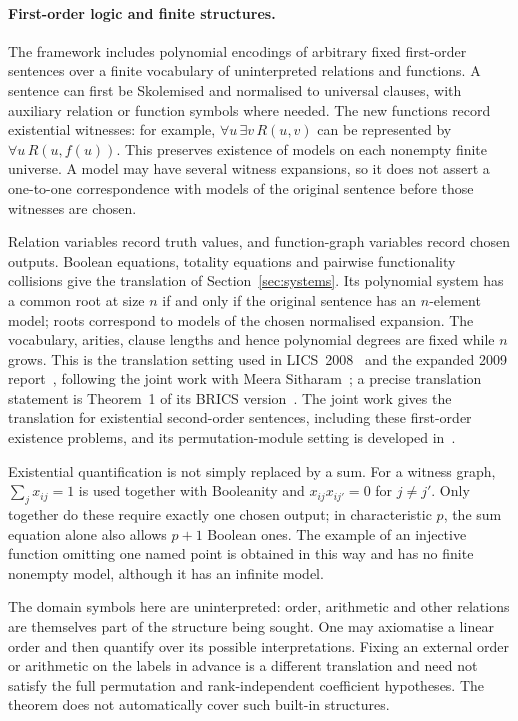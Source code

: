 \documentclass[11pt,a4paper]{article}
\theoremstyle{definition}\newtheorem{definition}[theorem]{Definition}
\theoremstyle{remark}\newtheorem{remark}[theorem]{Remark}
\begin{document}
\paragraph{First-order logic and finite structures.}
The framework includes polynomial encodings of arbitrary fixed
first-order sentences over a finite vocabulary of uninterpreted
relations and functions. A sentence can first be Skolemised and
normalised to universal clauses, with auxiliary relation or function
symbols where needed. The new functions record existential witnesses:
for example, $\forall u\,\exists v\,R(u,v)$ can be represented by
$\forall u\,R(u,f(u))$. This preserves existence of models on each
nonempty finite universe. A model may have several witness expansions,
so it does not assert a one-to-one correspondence with models of the
original sentence before those witnesses are chosen.

Relation variables record truth values, and function-graph variables
record chosen outputs. Boolean equations, totality equations and
pairwise functionality collisions give the translation of
Section~\ref{sec:systems}. Its polynomial system has a common root
at size $n$ if and only if the original sentence has an $n$-element
model; roots correspond to models of the chosen normalised expansion.
The vocabulary, arities, clause lengths and hence polynomial degrees
are fixed while $n$ grows. This is the translation setting used in
LICS~2008~\cite[Section~1.2, p.~273]{Riis} and the expanded
2009 report~\cite[Section~1.2, pp.~3--4]{RiisLong}, following the joint work
with Meera Sitharam~\cite{RiisSitharamTautologies}; a precise translation
statement is Theorem~1 of its BRICS version~\cite[Section~II]{RiisSitharamTranslationPreprint}. The joint work gives the
translation for existential second-order sentences, including these
first-order existence problems, and its permutation-module setting is
developed in~\cite{RiisSitharamModules}.

Existential quantification is not simply replaced by a sum. For a
witness graph, $\sum_j x_{ij}=1$ is used together with Booleanity and
$x_{ij}x_{ij'}=0$ for $j\ne j'$. Only together do these require exactly
one chosen output; in characteristic $p$, the sum equation alone also
allows $p+1$ Boolean ones. The example of an injective function omitting
one named point is obtained in this way and has no finite nonempty
model, although it has an infinite model.

The domain symbols here are uninterpreted: order, arithmetic and
other relations are themselves part of the structure being sought.
One may axiomatise a linear order and then quantify over its possible
interpretations. Fixing an external order or arithmetic on the labels
in advance is a different translation and need not satisfy the full
permutation and rank-independent coefficient hypotheses. The theorem
does not automatically cover such built-in structures.
\end{document}
